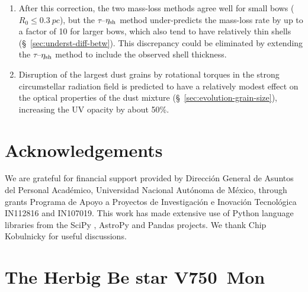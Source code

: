 \documentclass[useAMS, usenatbib, a4paper]{mnras}
\begin{document}
\begin{enumerate}[1.]
\item After this correction, the two mass-loss methods agree well for
  small bows (\(R_0 \le \SI{0.3}{pc}\)), but the
  \(\tau\)--\(\eta_{\text{sh}}\) method under-predicts the mass-loss rate by
  up to a factor of 10 for larger bows, which also tend to have
  relatively thin shells (\S~\ref{sec:underst-diff-betw}).  This
  discrepancy could be eliminated by extending the
  \(\tau\)--\(\eta_{\text{sh}}\) method to include the observed shell
  thickness.
\item Disruption of the largest dust grains by rotational torques in
  the strong circumstellar radiation field is predicted to have a
  relatively modest effect on the optical properties of the dust
  mixture (\S~\ref{sec:evolution-grain-size}), increasing the UV
  opacity by about 50\%.
\end{enumerate}


\section*{Acknowledgements}
We are grateful for financial support provided by Dirección General de
Asuntos del Personal Académico, Universidad Nacional Autónoma de
México, through grants Programa de Apoyo a Proyectos de Investigación
e Inovación Tecnológica IN112816 and IN107019.  This work has made
extensive use of Python language libraries from the SciPy
\citep{Jones:2001a}, AstroPy \citep{Astropy-Collaboration:2013a,
  Astropy-Collaboration:2018a} and Pandas \citep{McKinney:2010a}
projects.  We thank Chip Kobulnicky for useful discussions.





\appendix



\section{The Herbig Be star V750~Mon}
\label{sec:notes-part-sourc}
\label{sec:hd-53367-v750}
  
\end{document}
